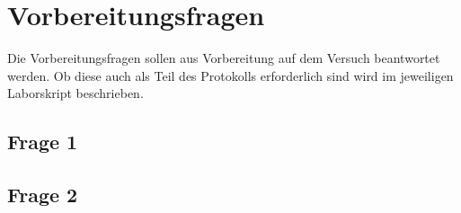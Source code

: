 \section{Vorbereitungsfragen}
Die Vorbereitungsfragen sollen aus Vorbereitung auf dem Versuch beantwortet werden. Ob diese auch als Teil des Protokolls erforderlich sind wird im jeweiligen Laborskript beschrieben.

\subsection{Frage 1}


\subsection{Frage 2}